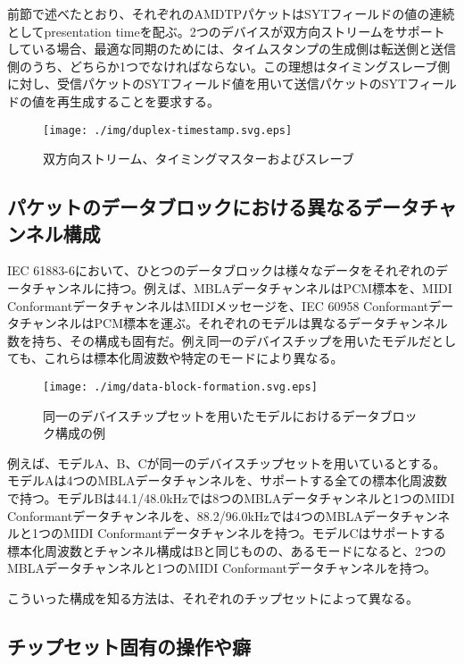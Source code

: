 \documentclass[onecolumn]{jarticle}
\begin{document}
前節で述べたとおり、それぞれのAMDTPパケットはSYTフィールドの値の連続としてpresentation timeを配ぶ。2つのデバイスが双方向ストリームをサポートしている場合、最適な同期のためには、タイムスタンプの生成側は転送側と送信側のうち、どちらか1つでなければならない。この理想はタイミングスレーブ側に対し、受信パケットのSYTフィールド値を用いて送信パケットのSYTフィールドの値を再生成することを要求する。


\begin{figure}[H]
	\centering
	\texttt{[image: ./img/duplex-timestamp.svg.eps]}
	\caption{{双方向ストリーム、タイミングマスターおよびスレーブ}}
	\label{duplex-timestamp}
\end{figure}


\subsection{パケットのデータブロックにおける異なるデータチャンネル構成}
\label{sec:formation-data-block}

IEC 61883-6\cite{iec61883-6-1, iec61883-6-2}において、ひとつのデータブロックは様々なデータをそれぞれのデータチャンネルに持つ。例えば、MBLAデータチャンネルはPCM標本を、MIDI ConformantデータチャンネルはMIDIメッセージを、IEC 60958 ConformantデータチャンネルはPCM標本を運ぶ。それぞれのモデルは異なるデータチャンネル数を持ち、その構成も固有だ。例え同一のデバイスチップを用いたモデルだとしても、これらは標本化周波数や特定のモードにより異なる。

\begin{figure}[H]
	\centering
	\texttt{[image: ./img/data-block-formation.svg.eps]}
	\caption{{同一のデバイスチップセットを用いたモデルにおけるデータブロック構成の例}}
	\label{dsp-route}
\end{figure}

例えば、モデルA、B、Cが同一のデバイスチップセットを用いているとする。モデルAは4つのMBLAデータチャンネルを、サポートする全ての標本化周波数で持つ。モデルBは44.1/48.0kHzでは8つのMBLAデータチャンネルと1つのMIDI Conformantデータチャンネルを、88.2/96.0kHzでは4つのMBLAデータチャンネルと1つのMIDI Conformantデータチャンネルを持つ。モデルCはサポートする標本化周波数とチャンネル構成はBと同じものの、あるモードになると、2つのMBLAデータチャンネルと1つのMIDI Conformantデータチャンネルを持つ。

こういった構成を知る方法は、それぞれのチップセットによって異なる。


\subsection{チップセット固有の操作や癖}
\end{document}
